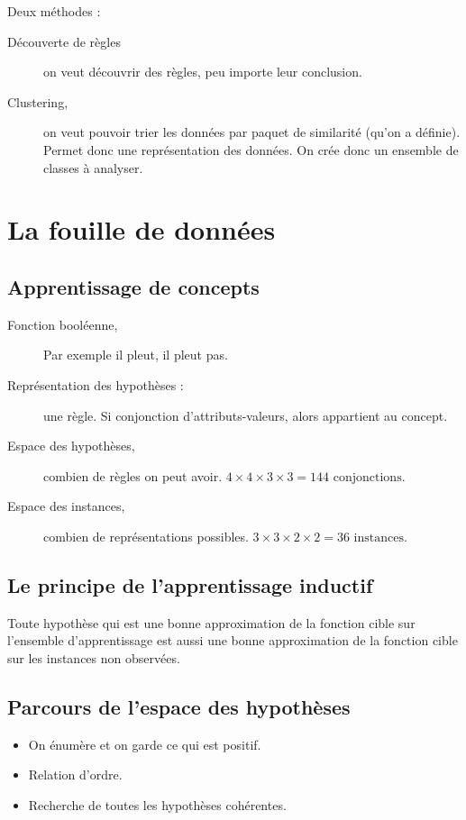 Deux méthodes :
\begin{description}
    \item[Découverte de règles] on veut découvrir des règles, peu importe leur conclusion.
    \item[Clustering,] on veut pouvoir trier les données par paquet de similarité (qu'on a définie). Permet donc une représentation des données. On crée donc un ensemble de classes à analyser.
\end{description}

\section{La fouille de données}
\subsection{Apprentissage de concepts}
\begin{description}
    \item[Fonction booléenne,] Par exemple il pleut, il pleut pas.
    \item[Représentation des hypothèses : ] une règle. Si conjonction d'attributs-valeurs, alors appartient au concept. 
    \item[Espace des hypothèses,] combien de règles on peut avoir. $ 4 \times 4 \times 3 \times 3 = 144 \text{~conjonctions} $.
    \item[Espace des instances,] combien de représentations possibles. $ 3 \times 3 \times 2 \times 2 = 36 \text{~instances} $.
\end{description}

\subsection{Le principe de l'apprentissage inductif}
Toute hypothèse qui est une bonne approximation de la fonction cible sur l'ensemble d'apprentissage est aussi une bonne approximation de la fonction cible sur les instances non observées.

\subsection{Parcours de l'espace des hypothèses}
\begin{itemize}
    \item On énumère et on garde ce qui est positif.
    \item Relation d'ordre.
    \item Recherche de toutes les hypothèses cohérentes. 
\end{itemize}


